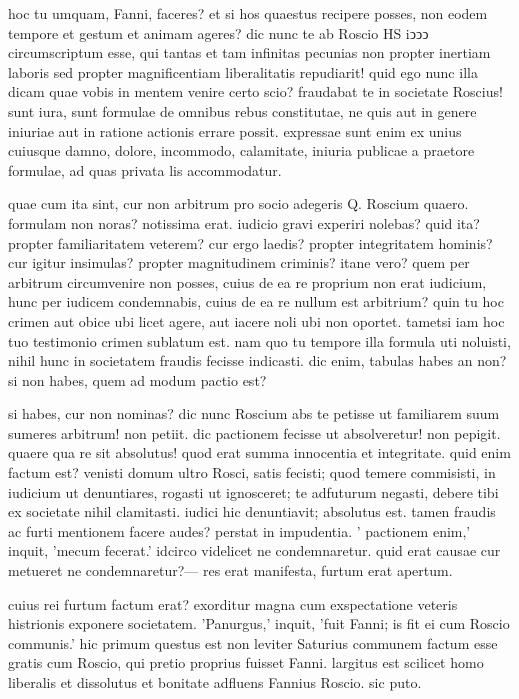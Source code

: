  hoc tu umquam, Fanni, faceres? et si hos quaestus recipere posses, non eodem tempore et gestum et animam ageres? dic nunc te ab Roscio HS iↄↄↄ circumscriptum esse, qui tantas et tam infinitas pecunias non propter inertiam laboris sed propter magnificentiam liberalitatis repudiarit! quid ego nunc illa dicam quae vobis in mentem venire certo scio? fraudabat te in societate Roscius! sunt iura, sunt formulae de omnibus rebus constitutae, ne quis aut in genere iniuriae aut in ratione actionis errare possit. expressae sunt enim ex unius cuiusque damno, dolore, incommodo, calamitate, iniuria publicae a praetore formulae, ad quas privata lis accommodatur.

 quae cum ita sint, cur non arbitrum pro socio adegeris Q. Roscium quaero. formulam non noras? notissima erat. iudicio gravi experiri nolebas? quid ita? propter familiaritatem veterem? cur ergo laedis? propter integritatem hominis? cur igitur insimulas? propter magnitudinem criminis? itane vero? quem per arbitrum circumvenire non posses, cuius de ea re proprium non erat iudicium, hunc per iudicem condemnabis, cuius de ea re nullum est arbitrium? quin tu hoc crimen aut obice ubi licet agere, aut iacere noli ubi non oportet. tametsi iam hoc tuo testimonio crimen sublatum est. nam quo tu tempore illa formula uti noluisti, nihil hunc in societatem fraudis fecisse indicasti. dic enim, tabulas habes an non? si non habes, quem ad modum pactio est?

 si habes, cur non nominas? dic nunc Roscium abs te petisse ut familiarem suum sumeres arbitrum! non petiit. dic pactionem fecisse ut absolveretur! non pepigit. quaere qua re sit absolutus! quod erat summa innocentia et integritate. quid enim factum est? venisti domum ultro Rosci, satis fecisti; quod temere commisisti, in iudicium ut denuntiares, rogasti ut ignosceret; te adfuturum negasti, debere tibi ex societate nihil clamitasti. iudici hic denuntiavit; absolutus est. tamen fraudis ac furti mentionem facere audes? perstat in impudentia. ' pactionem enim,' inquit, 'mecum fecerat.' idcirco videlicet ne condemnaretur. quid erat causae cur metueret ne condemnaretur?— res erat manifesta, furtum erat apertum.

 cuius rei furtum factum erat? exorditur magna cum exspectatione veteris histrionis exponere societatem. 'Panurgus,' inquit, 'fuit Fanni; is fit ei cum Roscio communis.' hic primum questus est non leviter Saturius communem factum esse gratis cum Roscio, qui pretio proprius fuisset Fanni. largitus est scilicet homo liberalis et dissolutus et bonitate adfluens Fannius Roscio. sic puto.

